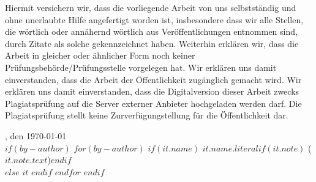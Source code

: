 \newpage
\pagestyle{empty}
Hiermit versichern wir, dass die vorliegende Arbeit von uns selbstständig und ohne unerlaubte Hilfe angefertigt worden ist, insbesondere dass wir alle Stellen, die wörtlich oder annähernd wörtlich aus Veröffentlichungen entnommen sind, durch Zitate als solche gekennzeichnet haben. Weiterhin erklären wir, dass die Arbeit in gleicher oder ähnlicher Form noch keiner Prüfungsbehörde/Prüfungsstelle vorgelegen hat. Wir erklären uns damit einverstanden, dass die Arbeit der Öffentlichkeit zugänglich gemacht wird. Wir erklären uns damit einverstanden, dass die Digitalversion dieser Arbeit zwecks Plagiatsprüfung auf die Server externer Anbieter hochgeladen werden darf. Die Plagiatsprüfung stellt keine Zurverfügungstellung für die Öffentlichkeit dar.\\ 

\vspace{6.0cm}

\noindent{}\texplatelocation, den \today \\


$if(by-author)$
$for(by-author)$
$if(it.name)$
\noindent{}$it.name.literal$$if(it.note)$ ({$it.note.text$})$endif$\\ 
$else$
$it$
$endif$
$endfor$
$endif$
